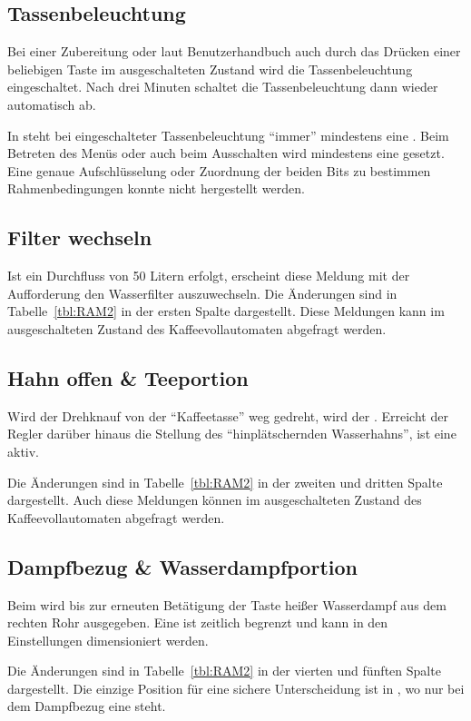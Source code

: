\subsection{Tassenbeleuchtung}
Bei einer Zubereitung oder laut Benutzerhandbuch auch durch das Drücken einer beliebigen Taste im ausgeschalteten Zustand wird die Tassenbeleuchtung eingeschaltet.
Nach drei Minuten schaltet die Tassenbeleuchtung dann wieder automatisch ab.

In  steht bei eingeschalteter Tassenbeleuchtung "`immer"' mindestens eine .
Beim Betreten des Menüs oder auch beim Ausschalten wird mindestens eine  gesetzt.
Eine genaue Aufschlüsselung oder Zuordnung der beiden Bits zu bestimmen Rahmenbedingungen konnte nicht hergestellt werden.

\subsection{Filter wechseln}
Ist ein Durchfluss von 50 Litern erfolgt, erscheint diese Meldung mit der Aufforderung den Wasserfilter auszuwechseln.
Die Änderungen sind in Tabelle~\ref{tbl:RAM2} in der ersten Spalte dargestellt.
Diese Meldungen kann im ausgeschalteten Zustand des Kaffeevollautomaten abgefragt werden.

\subsection{Hahn offen \& Teeportion}
Wird der Drehknauf von der "`Kaffeetasse"' weg gedreht, wird der .
Erreicht der Regler darüber hinaus die Stellung des "`hinplätschernden Wasserhahns"', ist eine  aktiv.

Die Änderungen sind in Tabelle~\ref{tbl:RAM2} in der zweiten und dritten Spalte dargestellt.
Auch diese Meldungen können im ausgeschalteten Zustand des Kaffeevollautomaten abgefragt werden.

\subsection{Dampfbezug \& Wasserdampfportion}
Beim  wird bis zur erneuten Betätigung der Taste heißer Wasserdampf aus dem rechten Rohr ausgegeben.
Eine  ist zeitlich begrenzt und kann in den Einstellungen dimensioniert werden.

Die Änderungen sind in Tabelle~\ref{tbl:RAM2} in der vierten und fünften Spalte dargestellt.
Die einzige Position für eine sichere Unterscheidung ist in , wo nur bei dem Dampfbezug eine  steht.

